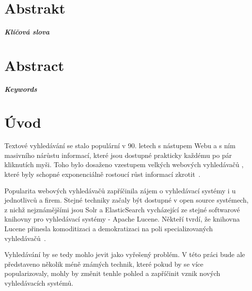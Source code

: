 \documentclass[11pt,letterpaper,oneside,openright]{book}
\begin{document}
\newpage
\chapter*{Abstrakt}
\paragraph{Klíčová slova}

\newpage
\chapter*{Abstract}
\paragraph{Keywords}

\newpage
{\hypersetup{hidelinks}
    \tableofcontents
}

\mainmatter
\chapter{Úvod}
Textové vyhledávání se stalo populární v 90. letech s nástupem Webu a s ním
masivního nárůstu informací, které jsou dostupné prakticky každému po pár
kliknutích myši. Toho bylo dosaženo vzestupem velkých webových vyhledávačů ,
které byly schopné exponenciálně rostoucí růst informací
zkrotit~\cite{search_history}.


Popularita webových vyhledávačů zapříčinila zájem o vyhledávací systémy i u
jednotlivců a firem. Stejné techniky začaly být dostupné v open source
systémech, z nichž nejznámějšími jsou Solr a ElasticSearch vycházející ze
stejné softwarové knihovny pro vyhledávací systémy - Apache Lucene. Někteří
tvrdí, že knihovna Lucene přinesla komoditizaci a demokratizaci na poli
specializovaných vyhledávačů~\cite{dion_almaer,javaworld}.

Vyhledávání by se tedy mohlo jevit jako vyřešený problém. V této práci bude ale
představeno několik méně známých technik, které pokud by se více
popularizovaly, mohly by změnit tenhle pohled a zapříčinit vznik nových
vyhledávacích systémů.
\end{document}
